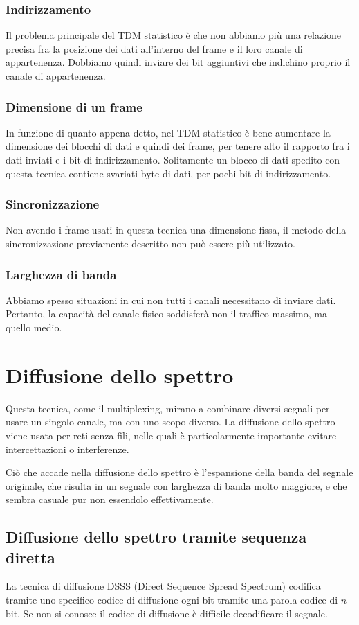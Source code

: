         \subsubsection{Indirizzamento}
            Il problema principale del TDM statistico è che non abbiamo più una relazione precisa fra la posizione dei dati all'interno del frame e il loro canale di appartenenza. Dobbiamo quindi inviare dei bit aggiuntivi che indichino proprio il canale di appartenenza.
            
        \subsubsection{Dimensione di un frame}
            In funzione di quanto appena detto, nel TDM statistico è bene aumentare la dimensione dei blocchi di dati e quindi dei frame, per tenere alto il rapporto fra i dati inviati e i bit di indirizzamento. Solitamente un blocco di dati spedito con questa tecnica contiene svariati byte di dati, per pochi bit di indirizzamento.
            
        \subsubsection{Sincronizzazione}
            Non avendo i frame usati in questa tecnica una dimensione fissa, il metodo della sincronizzazione previamente descritto non può essere più utilizzato.
            
        \subsubsection{Larghezza di banda}
            Abbiamo spesso situazioni in cui non tutti i canali necessitano di inviare dati. Pertanto, la capacità del canale fisico soddisferà non il traffico massimo, ma quello medio.
            
\section{Diffusione dello spettro}
    Questa tecnica, come il multiplexing, mirano a combinare diversi segnali per usare un singolo canale, ma con uno scopo diverso. La diffusione dello spettro viene usata per reti senza fili, nelle quali è particolarmente importante evitare intercettazioni o interferenze.
    
    Ciò che accade nella diffusione dello spettro è l'espansione della banda del segnale originale, che risulta in un segnale con larghezza di banda molto maggiore, e che sembra casuale pur non essendolo effettivamente.
    
    \subsection{Diffusione dello spettro tramite sequenza diretta}
        La tecnica di diffusione DSSS (Direct Sequence Spread Spectrum) codifica tramite uno specifico codice di diffusione ogni bit tramite una parola codice di $n$ bit. Se non si conosce il codice di diffusione è difficile decodificare il segnale.
